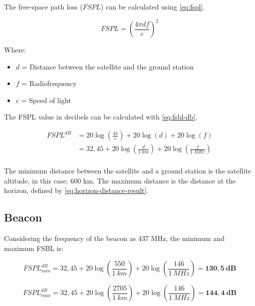 The free-space path loss ($FSPL$) can be calculated using \autoref{eq:fspl}.

\begin{equation} \label{eq:fspl}
FSPL = \left( \frac{4\pi d f}{c} \right)^{2}
\end{equation}

Where:

\begin{itemize}
    \item $d$ = Distance between the satellite and the ground station
    \item $f$ = Radiofrequency
    \item $c$ = Speed of light
\end{itemize}

The FSPL value in decibels can be calculated with \autoref{eq:fsbl-db}.

\begin{equation} \label{eq:fsbl-db}
    \begin{split}
        FSPL^{dB} & = 20\log\left(\frac{4\pi}{c}\right) + 20\log\left(d\right) + 20\log\left(f\right) \\
                  & = 32,45 + 20\log\left(\frac{d}{1\ km}\right) + 20\log\left(\frac{f}{1\ MHz}\right) \\
    \end{split}
\end{equation}

The minimum distance between the satellite and a ground station is the satellite altitude, in this case: 600 km. The maximum distance is the distance at the horizon, defined by \autoref{eq:horizon-distance-result}.

\subsection{Beacon}

Considering the frequency of the beacon as 437 MHz, the minimum and maximum FSBL is:

\begin{equation}
    FSPL^{dB}_{min} = 32,45 + 20\log\left(\frac{550}{1\ km}\right) + 20\log\left(\frac{146}{1\ MHz}\right) = \mathbf{130,5\ dB}
\end{equation}

\begin{equation}
    FSPL^{dB}_{max} = 32,45 + 20\log\left(\frac{2705}{1\ km}\right) + 20\log\left(\frac{146}{1\ MHz}\right) = \mathbf{144,4\ dB}
\end{equation}

